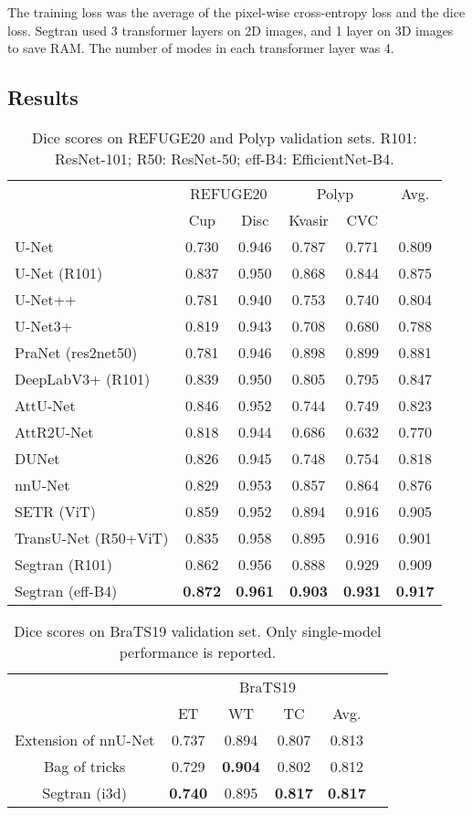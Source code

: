 \documentclass{article}
\begin{document}
The training loss was the average of the pixel-wise cross-entropy loss and the dice loss. 
Segtran used 3 transformer layers on 2D images, and 1 layer on 3D images to save RAM. The number of modes in each transformer layer was 4.

\subsection{Results}

\begin{table}[t]
\begin{centering}\setlength\tabcolsep{2pt}
\begin{tabular}{|m{3.3cm}|c|c|c|c|c|}
\hline 
& \multicolumn{2}{c|}{REFUGE20} & \multicolumn{2}{c|}{Polyp} & Avg.\tabularnewline
\cline{2-5} 
 & Cup & Disc & Kvasir & CVC & \tabularnewline
\hline 
U-Net & 0.730 & 0.946 & 0.787 & 0.771 & 0.809 \tabularnewline
\hline 
U-Net (R101) & 0.837 & 0.950 & 0.868 & 0.844 & 0.875 \tabularnewline
\hline 
U-Net++ & 0.781 & 0.940 & 0.753 & 0.740 & 0.804 \tabularnewline
\hline 
U-Net3+ & 0.819 & 0.943 & 0.708 & 0.680 & 0.788 \tabularnewline
\hline 
PraNet (res2net50) & 0.781 & 0.946 & 0.898 & 0.899 & 0.881 \tabularnewline
\hline 
DeepLabV3+ (R101) & 0.839 & 0.950 & 0.805 & 0.795 & 0.847 \tabularnewline
\hline 
AttU-Net & 0.846 & 0.952 & 0.744 & 0.749 & 0.823 \tabularnewline
\hline 
AttR2U-Net & 0.818 & 0.944 & 0.686 & 0.632 & 0.770 \tabularnewline
\hline 
DUNet & 0.826 & 0.945 & 0.748 & 0.754 & 0.818 \tabularnewline
\hline 
nnU-Net & 0.829 & 0.953 & 0.857 & 0.864 & 0.876 \tabularnewline\hline
SETR (ViT) & 0.859 & 0.952 & 0.894 & 0.916 & 0.905 \tabularnewline
\hline 
TransU-Net (R50+ViT) & 0.835 & 0.958 & 0.895 & 0.916 & 0.901 \tabularnewline
\hline 
Segtran (R101) & 0.862 & 0.956 & 0.888 & 0.929 & 0.909 \tabularnewline
\hline 
Segtran (eff-B4) & \textbf{0.872} & \textbf{0.961} & \textbf{0.903} & \textbf{0.931} & \textbf{0.917} \tabularnewline
\hline 
\end{tabular}
\caption{Dice scores on REFUGE20 and Polyp validation sets. R101: ResNet-101; R50: ResNet-50; eff-B4: EfficientNet-B4.}
\label{scores2d}
\par\end{centering}
\end{table}

\begin{table}
\begin{centering}
\begin{tabular}{|c|c|c|c|c|c|}
\hline 
\multirow{2}{*}{} & \multicolumn{4}{c|}{BraTS19}\tabularnewline
\cline{2-5}
 & ET & WT & TC & Avg. \tabularnewline
\hline 
Extension of nnU-Net & 0.737 & 0.894 & 0.807 & 0.813 \tabularnewline
\hline 
Bag of tricks & 0.729 & \textbf{0.904} & 0.802 & 0.812 \tabularnewline
\hline 
Segtran (i3d) & \textbf{0.740} & 0.895 & \textbf{0.817} &  \textbf{0.817} \tabularnewline
\hline 
\end{tabular}
\caption{Dice scores on BraTS19 validation set. Only single-model performance is reported.}
\label{scores3d}
\par\end{centering}
\end{table}
\end{document}

